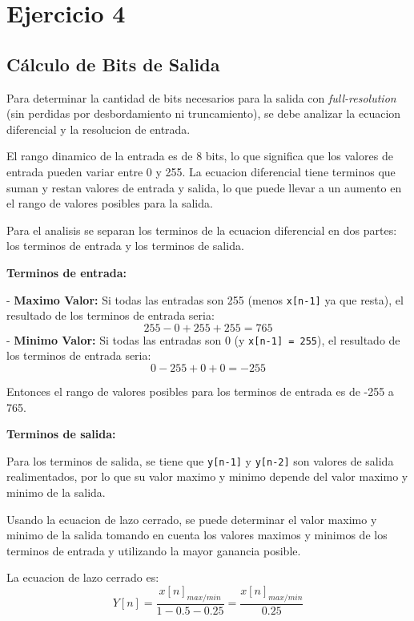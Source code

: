 \documentclass[11pt,a4paper]{article}
\begin{document}
\section{Ejercicio 4}

\subsection{Cálculo de Bits de Salida}

Para determinar la cantidad de bits necesarios para la salida con \textit{full-resolution} (sin perdidas
por desbordamiento ni truncamiento), se debe analizar la ecuacion diferencial y la resolucion de entrada.

El rango dinamico de la entrada es de 8 bits, lo que significa que los valores de entrada pueden
variar entre 0 y 255. La ecuacion diferencial tiene terminos que suman y restan valores de entrada y salida,
lo que puede llevar a un aumento en el rango de valores posibles para la salida.

Para el analisis se separan los terminos de la ecuacion diferencial en dos partes: los terminos de entrada
y los terminos de salida.

\textbf{Terminos de entrada:}

- \textbf{Maximo Valor:} Si todas las entradas son 255 (menos \texttt{x[n-1]} ya que resta), el resultado
de los terminos de entrada seria:
\begin{equation}
    255 - 0 + 255 + 255 = 765
\end{equation}
- \textbf{Minimo Valor:} Si todas las entradas son 0 (y \texttt{x[n-1] = 255}), el resultado de los
terminos de entrada seria:
\begin{equation}
    0 - 255 + 0 + 0 = -255
\end{equation}

Entonces el rango de valores posibles para los terminos de entrada es de -255 a 765.

\textbf{Terminos de salida:}

Para los terminos de salida, se tiene que \texttt{y[n-1]} y \texttt{y[n-2]} son valores de salida realimentados,
por lo que su valor maximo y minimo depende del valor maximo y minimo de la salida.

Usando la ecuacion de lazo cerrado, se puede determinar el valor maximo y minimo de la salida tomando
en cuenta los valores maximos y minimos de los terminos de entrada y utilizando la mayor ganancia posible.

La ecuacion de lazo cerrado es:
\begin{equation}
    Y[n] = \frac{x[n]_{max/min}}{1 - 0.5 - 0.25} = \frac{x[n]_{max/min}}{0.25}
\end{equation}
\end{document}
